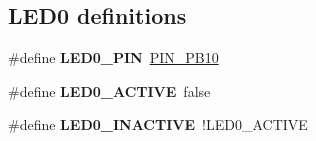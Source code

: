 \subsection*{L\+E\+D0 definitions}
\begin{DoxyCompactItemize}
\item 
\hypertarget{group__saml21__xplained__pro__features__group_ga3fc522fda449d6edde717d6a857429cf}{}\#define {\bfseries L\+E\+D0\+\_\+\+P\+I\+N}~\hyperlink{pio_2saml21j18a_8h_ace5077df47f85d8716961068d23999f9}{P\+I\+N\+\_\+\+P\+B10}\label{group__saml21__xplained__pro__features__group_ga3fc522fda449d6edde717d6a857429cf}

\item 
\hypertarget{group__saml21__xplained__pro__features__group_ga59e133b8ded0d632eeaeb2cbfec48886}{}\#define {\bfseries L\+E\+D0\+\_\+\+A\+C\+T\+I\+V\+E}~false\label{group__saml21__xplained__pro__features__group_ga59e133b8ded0d632eeaeb2cbfec48886}

\item 
\hypertarget{group__saml21__xplained__pro__features__group_gaed3274cfe7ed308899e8416219bb08d2}{}\#define {\bfseries L\+E\+D0\+\_\+\+I\+N\+A\+C\+T\+I\+V\+E}~!L\+E\+D0\+\_\+\+A\+C\+T\+I\+V\+E\label{group__saml21__xplained__pro__features__group_gaed3274cfe7ed308899e8416219bb08d2}

\end{DoxyCompactItemize}
